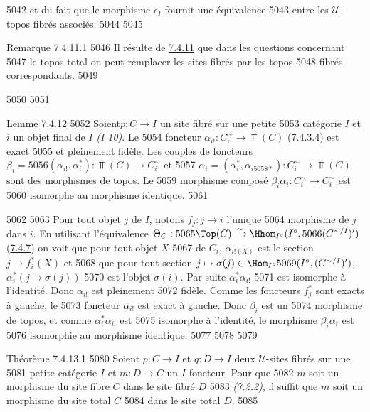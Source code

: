   5042	et du fait que le morphisme $\epsilon_{I}$ fournit une équivalence
  5043	entre les $𝒰$-topos fibrés associés.
  5044	
  5045	\begin{enonce*}[remark]{Remarque 7.4.11.1}
  5046	Il résulte de \hyperref[VI.cor7.4.11]{7.4.11} que dans les questions concernant
  5047	le topos total on peut remplacer les sites fibrés par les topos
  5048	fibrés correspondants.
  5049	\end{enonce*}
  5050	
  5051	\begin{enonce*}{Lemme 7.4.12}
  5052	Soient\pageoriginale $p : C \to I$ un site fibré sur une petite
  5053	catégorie $I$ et $i$ un objet final de $I$ \emph{(I 10)}. Le
  5054	foncteur $\alpha_{i!} : C^{\sim}_i \to \Top(C)$ (7.4.3.4) est exact
  5055	et pleinement fidèle. Les couples de foncteurs $\beta_i =
  5056	(\alpha_{i!}, \alpha^{\ast}_i) : \Top(C) \to C^{\sim}_i$ et
  5057	$\alpha_i = (\alpha_{i}^{\ast}, \alpha_{i
  5058	  \ast}) : C^{\sim}_i \to \Top(C)$ sont des morphismes de topos. Le
  5059	morphisme composé $\beta_i \alpha_i : C^{\sim}_i \to C^{\sim}_i$ est
  5060	isomorphe au morphisme identique.
  5061	\end{enonce*}
  5062	
  5063	Pour tout objet $j$ de $I$, notons $f_j : j \to i$ l'unique
  5064	morphisme de $j$ dans $i$. En utilisant l'équivalence $\Theta_C :
  5065	\Top(C) \xrightarrow{\sim} \Hhom_{I^{\circ}} (I^{\circ},
  5066	(C^{\sim/I})')$ (\hyperref[VI.prop7.4.7]{7.4.7}) on voit que pour tout objet $X$
  5067	de $C_i$, $\alpha_{i! (X)}$ est le section $j \to f^{\ast}_i(X)$ et
  5068	que pour tout section $j \mapsto \sigma(j) \in \Hom_{I^{\circ}}
  5069	(I^{\circ}, (C^{\sim/I})')$, $\alpha^{\ast}_i (j \mapsto \sigma(j))$
  5070	est  l'objet $\sigma(i)$. Par suite $\alpha^{\ast}_{i} \alpha_{i!}$
  5071	est isomorphe à l'identité. Donc $\alpha_{i!}$ est pleinement
  5072	fidèle. Comme les foncteurs $f^{\ast}_{j}$ sont exacts à gauche, le
  5073	foncteur $\alpha_{i!}$ est exact à gauche. Donc $\beta_i$ est un
  5074	morphisme de topos, et comme $\alpha^{\ast}_{i} \alpha_{i!}$ est
  5075	isomorphe à l'identité, le morphisme $\beta_i \alpha_i$ est
  5076	isomorphie au morphisme identique.
  5077	
  5078	
  5079	\begin{enonce*}{Théorème 7.4.13.1}
  5080	Soient $p : C \to I$ et $q : D \to I$ deux $𝒰$-sites fibrés sur une
  5081	petite catégorie $I$ et $m : D \to C$ un $I$-foncteur. Pour que
  5082	$m$ soit un morphisme du site fibre $C$ dans le site fibré $D$
  5083	\emph{(\hyperref[VI.subsubsec7.2.2]{7.2.2})}, il suffit que $m$ soit un morphisme du site total $C$
  5084	dans le site total $D$.
  5085	\end{enonce*}
